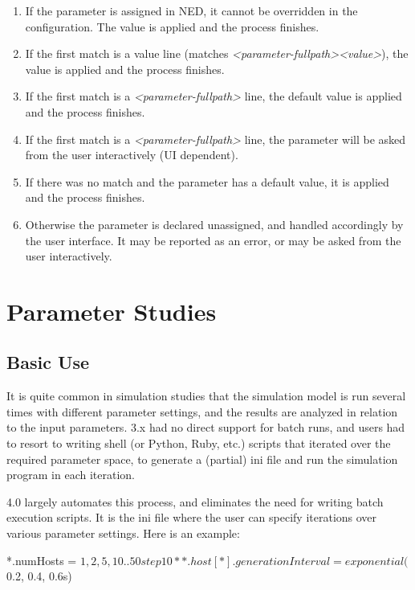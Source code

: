 \begin{enumerate}
\item If the parameter is assigned in NED, it cannot be overridden in the
    configuration. The value is applied and the process finishes.
\item If the first match is a value line (matches
    \textit{<parameter-fullpath>}\ttt{=}\textit{<value>}), the value is
    applied and the process finishes.
\item If the first match is a \textit{<parameter-fullpath>} line,
    the default value is applied and the process finishes.
\item If the first match is a \textit{<parameter-fullpath>} line,
    the parameter will be asked from the user interactively (UI dependent).
\item If there was no match and the parameter has a default value, it is applied
    and the process finishes.
\item Otherwise the parameter is declared unassigned, and handled accordingly
    by the user interface. It may be reported as an error, or may be
    asked from the user interactively.
\end{enumerate}


\section{Parameter Studies}

\subsection{Basic Use}


It is quite common in simulation studies that the simulation model is
run several times with different parameter settings, and the results
are analyzed in relation to the input parameters. {\opp} 3.x had no
direct support for batch runs, and users had to resort to writing shell
(or Python, Ruby, etc.) scripts that iterated over the required
parameter space, to generate a (partial) ini file and run the
simulation program in each iteration.

{\opp} 4.0 largely automates this process, and eliminates the need for
writing batch execution scripts. It is the ini file where the user can
specify iterations over various parameter settings.
Here is an example:

\begin{inifile}
*.numHosts = ${1, 2, 5, 10..50 step 10}
**.host[*].generationInterval = exponential(${0.2, 0.4, 0.6}s)
\end{inifile}


